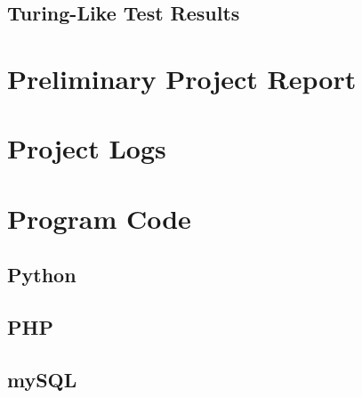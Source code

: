 \subsection{Turing-Like Test Results}


      


\section{Preliminary Project Report}






\section{Project Logs}


\section{Program Code}

\subsection{Python}
\subsection{PHP}
\subsection{mySQL}